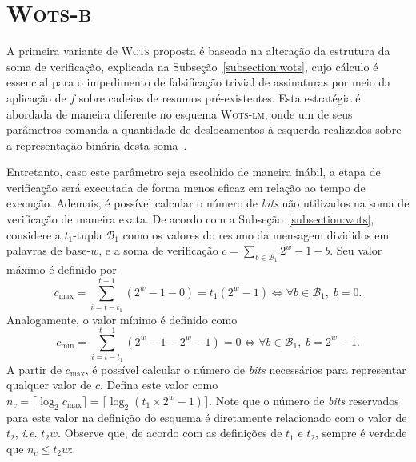 \documentclass{ufsctex/ufsctex}
\newcommand{\wots}{\textsc{Wots}}
\newcommand{\wotslm}{\textsc{Wots-lm}}
\newcommand{\wotsb}{\textsc{Wots-b}}
\begin{document}
\section{\wotsb{}}\label{section:wotsb}

A primeira variante de \wots{} proposta é baseada na alteração da estrutura da
soma de verificação, explicada na Subseção~\ref{subsection:wots}, cujo cálculo
é essencial para o impedimento de falsificação trivial de assinaturas por meio
da aplicação de $f$ sobre cadeias de resumos pré-existentes. Esta estratégia é
abordada de maneira diferente no esquema \wotslm{}, onde um de seus parâmetros
comanda a quantidade de deslocamentos à esquerda realizados sobre a
representação binária desta soma~\cite[Seção 4.4]{McGrew:report:2018:apr}.

Entretanto, caso este parâmetro seja escolhido de maneira inábil, a etapa de
verificação será executada de forma menos eficaz em relação ao tempo de
execução. Ademais, é possível calcular o número de \emph{bits} não utilizados
na soma de verificação de maneira exata. De acordo com a
Subseção~\ref{subsection:wots}, considere a $t_1$-tupla $\mathcal{B}_1$ como os
valores do resumo da mensagem divididos em palavras de base-$w$, e a soma de
verificação $c = \sum_{b \in \mathcal{B}_1} 2^w - 1 - b$. Seu valor máximo é
definido por
\begin{equation}
  c_{\max} = \sum_{i = t - t_1}^{t - 1} (2^w - 1 - 0) = t_1(2^w - 1)
    \iff \forall b \in \mathcal{B}_1, \; b = 0.
\end{equation}
Analogamente, o valor mínimo é definido como
\begin{equation}
  c_{\min} = \sum_{i = t - t_1}^{t - 1} (2^w - 1 - 2^w - 1) = 0
    \iff \forall b \in \mathcal{B}_1, \; b = 2^w - 1.
\end{equation}
A partir de $c_{\max}$, é possível calcular o número de \emph{bits} necessários
para representar qualquer valor de $c$. Defina este valor como $n_c = \lceil
\log_2 c_{\max} \rceil = \lceil \log_2 (t_1 \times 2^w - 1) \rceil$. Note que o
número de \emph{bits} reservados para este valor na definição do esquema é
diretamente relacionado com o valor de $t_2$, \emph{i.e.} $t_2w$. Observe que,
de acordo com as definições de $t_1$ e $t_2$, sempre é verdade que $n_c \leq
t_2w$:
\end{document}
